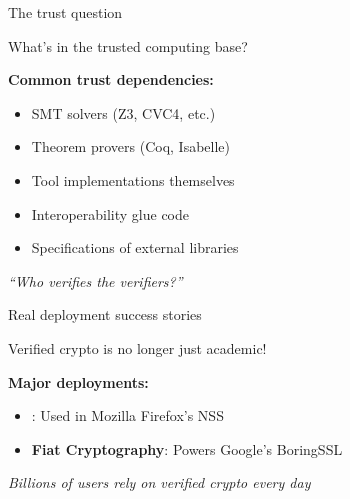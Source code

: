 \documentclass[aspectratio=169, lualatex, handout]{beamer}
\begin{document}
\begin{frame}{The trust question}
	\begin{center}
		\Large
		What's in the trusted computing base?
	\end{center}
	\vspace{1em}
	\textbf{Common trust dependencies:}
	\begin{itemize}
		\item SMT solvers (Z3, CVC4, etc.)
		\item Theorem provers (Coq, Isabelle)
		\item Tool implementations themselves
		\item Interoperability glue code
		\item Specifications of external libraries
	\end{itemize}
	\vspace{0.5em}
	\begin{center}
		\textit{``Who verifies the verifiers?''}
	\end{center}
\end{frame}

\begin{frame}{Real deployment success stories}
	\begin{center}
		\Large
		Verified crypto is no longer just academic!
	\end{center}
	\vspace{1em}
	\textbf{Major deployments:}
	\begin{itemize}
		\item \textbf{\haclstar}: Used in Mozilla Firefox's NSS
		\item \textbf{Fiat Cryptography}: Powers Google's BoringSSL
	\end{itemize}
	\vspace{0.5em}
	\begin{center}
		\textit{Billions of users rely on verified crypto every day}
	\end{center}
\end{frame}
\end{document}
